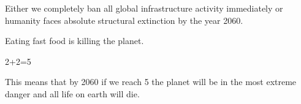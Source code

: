 Either we completely ban all global infrastructure activity immediately or humanity faces absolute structural extinction by the year 2060.

Eating fast food is killing the planet.

2+2=5

This means that by 2060 if we reach 5 the planet will be in the most extreme danger and all life on earth will die.



